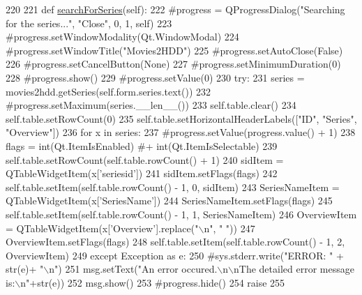 \begin{DoxyCode}
220 
221         \textcolor{keyword}{def }\hyperlink{classmovies2hdd_1_1gui_1_1_series_selection_a59d9d53410754b1a797e2ec645c57591}{searchForSeries}(self):
222             \textcolor{comment}{#progress = QProgressDialog("Searching for the series...", "Close", 0, 1, self)}
223             \textcolor{comment}{#progress.setWindowModality(Qt.WindowModal)}
224             \textcolor{comment}{#progress.setWindowTitle("Movies2HDD")}
225             \textcolor{comment}{#progress.setAutoClose(False)}
226             \textcolor{comment}{#progress.setCancelButton(None)}
227             \textcolor{comment}{#progress.setMinimumDuration(0)}
228             \textcolor{comment}{#progress.show()}
229             \textcolor{comment}{#progress.setValue(0)}
230             \textcolor{keywordflow}{try}:
231                 series = movies2hdd.getSeries(self.form.series.text())
232                 \textcolor{comment}{#progress.setMaximum(series.\_\_len\_\_())}
233                 self.table.clear()
234                 self.table.setRowCount(0)
235                 self.table.setHorizontalHeaderLabels([\textcolor{stringliteral}{"ID"}, \textcolor{stringliteral}{"Series"}, \textcolor{stringliteral}{"Overview"}])
236                 \textcolor{keywordflow}{for} x \textcolor{keywordflow}{in} series:
237                     \textcolor{comment}{#progress.setValue(progress.value() + 1)}
238                     flags = int(Qt.ItemIsEnabled) \textcolor{comment}{#+ int(Qt.ItemIsSelectable)}
239                     self.table.setRowCount(self.table.rowCount() + 1)
240                     sidItem = QTableWidgetItem(x[\textcolor{stringliteral}{'seriesid'}])
241                     sidItem.setFlags(flags)
242                     self.table.setItem(self.table.rowCount() - 1, 0, sidItem)
243                     SeriesNameItem = QTableWidgetItem(x[\textcolor{stringliteral}{'SeriesName'}])
244                     SeriesNameItem.setFlags(flags)
245                     self.table.setItem(self.table.rowCount() - 1, 1, SeriesNameItem)
246                     OverviewItem = QTableWidgetItem(x[\textcolor{stringliteral}{'Overview'}].replace(\textcolor{stringliteral}{"\(\backslash\)n"}, \textcolor{stringliteral}{"   "}))
247                     OverviewItem.setFlags(flags)
248                     self.table.setItem(self.table.rowCount() - 1, 2, OverviewItem)
249             \textcolor{keywordflow}{except} Exception \textcolor{keyword}{as} e:
250                 \textcolor{comment}{#sys.stderr.write("ERROR: " + str(e)+ "\(\backslash\)n")}
251                 msg.setText(\textcolor{stringliteral}{"An error occured.\(\backslash\)n\(\backslash\)nThe detailed error message is:\(\backslash\)n"}+str(e))
252                 msg.show()
253                 \textcolor{comment}{#progress.hide()}
254                 \textcolor{keywordflow}{raise}
255 

\end{DoxyCode}
